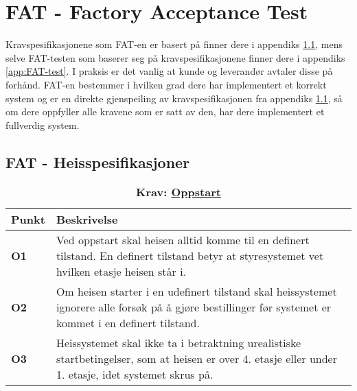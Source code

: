 \section{FAT - Factory Acceptance Test}\label{subsec:FAT}

Kravspesifikasjonene som FAT-en er basert på finner dere i appendiks \ref{app:FATkrav}, mens selve FAT-testen som baserer seg på kravspesifikasjonene finner dere i appendiks \ref{app:FAT-test}. I praksis er det vanlig at kunde og leverandør avtaler disse på forhånd. FAT-en bestemmer i hvilken grad dere har implementert et korrekt system og er en direkte gjenspeiling av kravspesifikasjonen fra appendiks \ref{app:FATkrav}, så om dere oppfyller alle kravene som er satt av den, har dere implementert et fullverdig system.


\subsection{FAT - Heisspesifikasjoner}\label{app:FATkrav}


\begin{table}[H]
    \centering
    \caption*{\textbf{\textcolor{NTNU_blue}{Krav}: \underline{Oppstart}}}
    \begin{tabular}{@{}  |p{1.25cm}| p{12.25cm}|  @{}}
    \hline
    \textbf{Punkt}             & \textbf{Beskrivelse} \\
    \hline
    \textbf{\textcolor{NTNU_blue}{O1}} & Ved oppstart skal heisen alltid komme til en definert tilstand. En definert tilstand betyr at styresystemet vet hvilken etasje heisen står i.\\\cline{1-2} 
    \textbf{\textcolor{NTNU_blue}{O2}} & Om heisen starter i en udefinert tilstand skal heissystemet ignorere alle forsøk på å gjøre bestillinger før systemet er kommet i en definert tilstand.\\\cline{1-2} 
    \textbf{\textcolor{NTNU_blue}{O3}} & Heissystemet skal ikke ta i betraktning urealistiske startbetingelser, som at heisen er over 4. etasje eller under 1. etasje, idet systemet skrus på.\\\cline{1-2} 
    \end{tabular}
\end{table}


